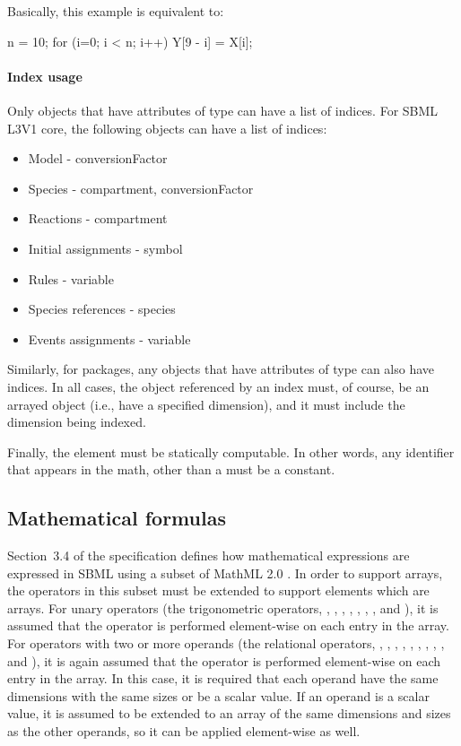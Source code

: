 Basically, this example is equivalent to:

\begin{example}
n = 10;
for (i=0; i < n; i++) {
    Y[9 - i] = X[i];
}
\end{example}

\paragraph{Index usage}

Only objects that have attributes of  type can have a list of indices.  For SBML L3V1 core, the following objects can have a list of indices:
\begin{itemize}
\item Model - conversionFactor
\item Species - compartment, conversionFactor
\item Reactions - compartment
\item Initial assignments - symbol
\item Rules - variable
\item Species references - species
\item Events assignments - variable
\end{itemize}
Similarly, for packages, any objects that have attributes of  type can also have indices.
In all cases, the object referenced by an index must, of course, be an arrayed object (i.e., have a specified dimension), and it must include the dimension being indexed.

Finally, the  element must be statically computable.  In other words, any identifier that appears in the math, other than a \Dimension {} must be a constant.

\subsection{Mathematical formulas}

Section~3.4 of the \sbmlthreecore specification defines how mathematical expressions are expressed in SBML using a subset of MathML 2.0 \citep{w3c:2000b}.  In order to support arrays, the operators in this subset must be extended to support  elements which are arrays.  For unary operators (the trigonometric operators, , , , , , , , and ), it is assumed that the operator is performed element-wise on each entry in the array.  For operators with two or more operands (the relational operators, , , , , , , , , , and ), it is again assumed that the operator is performed element-wise on each entry in the array.  In this case, it is required that each operand have the same dimensions with the same sizes or be a scalar value.  If an operand is a scalar value, it is assumed to be extended to an array of the same dimensions and sizes as the other operands, so it can be applied element-wise as well.  

